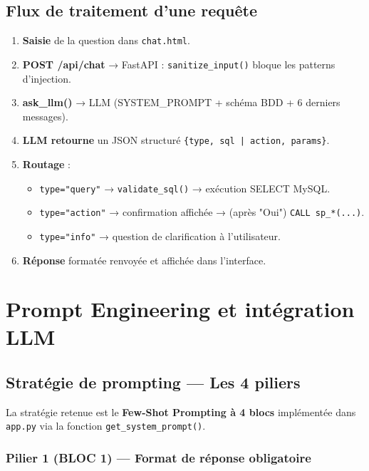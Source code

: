 \documentclass[12pt, a4paper, oneside]{report}
\begin{document}
\section{Flux de traitement d'une requête}

\begin{enumerate}[itemsep=4pt]
  \item \textbf{Saisie} de la question dans \texttt{chat.html}.
  \item \textbf{POST /api/chat} → FastAPI : \texttt{sanitize\_input()} bloque
    les patterns d'injection.
  \item \textbf{ask\_llm()} → LLM (SYSTEM\_PROMPT + schéma BDD + 6 derniers messages).
  \item \textbf{LLM retourne} un JSON structuré \texttt{\{type, sql | action, params\}}.
  \item \textbf{Routage} :
    \begin{itemize}
      \item \texttt{type="query"} → \texttt{validate\_sql()} → exécution SELECT MySQL.
      \item \texttt{type="action"} → confirmation affichée → (après "Oui")
        \texttt{CALL sp\_*(...)}.
      \item \texttt{type="info"} → question de clarification à l'utilisateur.
    \end{itemize}
  \item \textbf{Réponse} formatée renvoyée et affichée dans l'interface.
\end{enumerate}

\chapter{Prompt Engineering et intégration LLM}

\section{Stratégie de prompting — Les 4 piliers}

La stratégie retenue est le \textbf{Few-Shot Prompting à 4 blocs} implémentée dans
\texttt{app.py} via la fonction \texttt{get\_system\_prompt()}.

\subsection{Pilier 1 (BLOC 1) — Format de réponse obligatoire}
\end{document}
